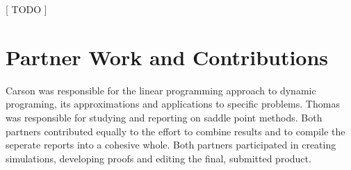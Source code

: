 \documentclass[12pt,reqno]{amsart}
\numberwithin{equation}{section}
\begin{document}
[ TODO ]

\section{Partner Work and Contributions}

Carson was responsible for the linear programming approach to dynamic programing, its approximations and applications to specific problems. Thomas was responsible for studying and reporting on saddle point methods. Both partners contributed equally to the effort to combine results and to compile the seperate reports into a cohesive whole. Both partners participated in creating simulations, developing proofs and editing the final, submitted product.









\bigskip
\end{document}
